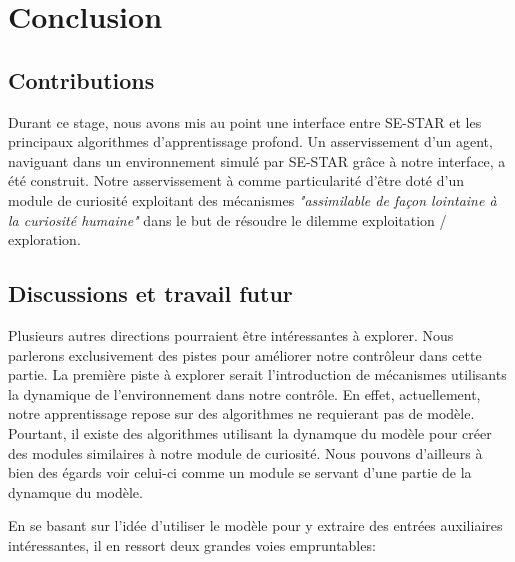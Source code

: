 \section{Conclusion}
\subsection{Contributions}

Durant ce stage, nous avons mis au point une interface entre SE-STAR et les principaux algorithmes d'apprentissage profond. Un asservissement d'un agent, naviguant dans un environnement simulé par SE-STAR grâce à notre interface, a été construit. Notre asservissement à comme particularité d'être doté d'un module de curiosité exploitant des mécanismes \emph{"assimilable de façon lointaine à la curiosité humaine"} dans le but de résoudre le dilemme exploitation / exploration.


\subsection{Discussions et travail futur}

Plusieurs autres directions pourraient être intéressantes à explorer. Nous parlerons exclusivement des pistes pour améliorer notre contrôleur dans cette partie. La première piste à explorer serait l'introduction de mécanismes utilisants la dynamique de l'environnement dans notre contrôle. En effet, actuellement, notre apprentissage repose sur des algorithmes ne requierant pas de modèle. Pourtant, il existe des algorithmes utilisant la dynamque du modèle pour créer des modules similaires à notre module de curiosité. Nous pouvons d'ailleurs à bien des égards voir celui-ci comme un module se servant d'une partie de la dynamque du modèle. 

En se basant sur l'idée d'utiliser le modèle pour y extraire des entrées auxiliaires intéressantes, il en ressort deux grandes voies empruntables:

